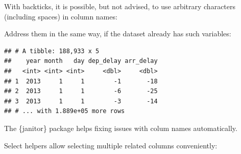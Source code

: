 \documentclass[]{book}
\newenvironment{Shaded}{}{}
\newcommand{\DataTypeTok}[1]{#1}
\newcommand{\DecValTok}[1]{#1}
\newcommand{\KeywordTok}[1]{\textcolor[rgb]{0.00,0.00,1.00}{#1}}
\newcommand{\NormalTok}[1]{#1}
\newcommand{\OperatorTok}[1]{#1}
\newcommand{\StringTok}[1]{\textcolor[rgb]{0.00,0.50,0.50}{#1}}
\begin{document}
With backticks, it is possible, but not advised, to use arbitrary characters (including spaces) in column names:

\begin{Shaded}
\end{Shaded}

Address them in the same way, if the dataset already has such variables:

\begin{Shaded}
\end{Shaded}

\begin{verbatim}
## # A tibble: 188,933 x 5
##    year month   day dep_delay arr_delay
##   <int> <int> <int>     <dbl>     <dbl>
## 1  2013     1     1        -1       -18
## 2  2013     1     1        -6       -25
## 3  2013     1     1        -3       -14
## # ... with 1.889e+05 more rows
\end{verbatim}

The \{janitor\} package helps fixing issues with colum names automatically.

Select helpers allow selecting multiple related columns conveniently:

\begin{Shaded}
\end{Shaded}
\end{document}
